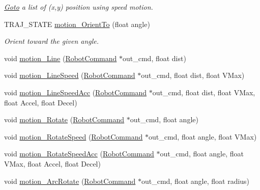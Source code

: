 \begin{DoxyCompactItemize}
\begin{DoxyCompactList}\small\item\em \hyperlink{classGoto}{Goto} a list of (x,y) position using speed motion. \end{DoxyCompactList}\item 
\mbox{\label{classAsservInsa_aea5aa879c72353a31b186a11a11ef08c}} 
T\+R\+A\+J\+\_\+\+S\+T\+A\+TE \hyperlink{classAsservInsa_aea5aa879c72353a31b186a11a11ef08c}{motion\+\_\+\+Orient\+To} (float angle)
\begin{DoxyCompactList}\small\item\em Orient toward the given angle. \end{DoxyCompactList}\item 
void \hyperlink{classAsservInsa_ab0fe0ad459e394938598a8b031118edb}{motion\+\_\+\+Line} (\hyperlink{structRobotCommand}{Robot\+Command} $\ast$out\+\_\+cmd, float dist)
\item 
void \hyperlink{classAsservInsa_af0aa05c12a2d8eb278f84e1b7472ca83}{motion\+\_\+\+Line\+Speed} (\hyperlink{structRobotCommand}{Robot\+Command} $\ast$out\+\_\+cmd, float dist, float V\+Max)
\item 
void \hyperlink{classAsservInsa_af749fa1a3cefdb6593451a2ff4114bd8}{motion\+\_\+\+Line\+Speed\+Acc} (\hyperlink{structRobotCommand}{Robot\+Command} $\ast$out\+\_\+cmd, float dist, float V\+Max, float Accel, float Decel)
\item 
void \hyperlink{classAsservInsa_ae7c7edab12c43ce352a694e95994c972}{motion\+\_\+\+Rotate} (\hyperlink{structRobotCommand}{Robot\+Command} $\ast$out\+\_\+cmd, float angle)
\item 
void \hyperlink{classAsservInsa_a1c9e34ba184f7d4c651955185d022605}{motion\+\_\+\+Rotate\+Speed} (\hyperlink{structRobotCommand}{Robot\+Command} $\ast$out\+\_\+cmd, float angle, float V\+Max)
\item 
void \hyperlink{classAsservInsa_ada416b12d072bc0a4bf6ecfebc0dcbc5}{motion\+\_\+\+Rotate\+Speed\+Acc} (\hyperlink{structRobotCommand}{Robot\+Command} $\ast$out\+\_\+cmd, float angle, float V\+Max, float Accel, float Decel)
\item 
void \hyperlink{classAsservInsa_ad243e9562a5191e34aed076e52e8fab8}{motion\+\_\+\+Arc\+Rotate} (\hyperlink{structRobotCommand}{Robot\+Command} $\ast$out\+\_\+cmd, float angle, float radius)
\item 
\mbox{\label{classAsservInsa_a592cd9219768e4cf06541589f106a6b5}} 

\end{DoxyCompactItemize}
